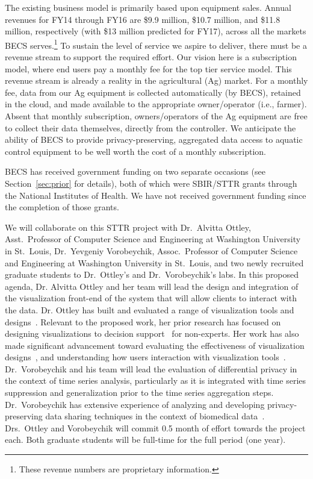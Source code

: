 The existing business model is primarily based upon equipment sales.
Annual revenues for FY14 through FY16 are \$9.9 million, \$10.7 million,
and \$11.8 million, respectively
(with \$13 million predicted for FY17), across all the markets BECS
serves.\footnote{These revenue numbers are proprietary information.}
To sustain the level of service we aspire to deliver, there must be
a revenue stream to support the required effort.  Our vision here is
a subscription model, where end users pay a monthly fee for the
top tier service model.
This revenue stream is already a reality in the agricultural (Ag) market.
For a monthly fee, data from our Ag equipment is collected automatically
(by BECS), retained in the cloud, and made available to the appropriate
owner/operator (i.e., farmer).  Absent that monthly subscription,
owners/operators of the Ag equipment are free to collect their data
themselves, directly from the controller.
We anticipate the ability of BECS to provide privacy-preserving,
aggregated data access to aquatic control equipment to be well worth
the cost of a monthly subscription.

BECS has received government funding on two separate occasions
(see Section~\ref{sec:prior} for details), both of which were SBIR/STTR
grants through the National Institutes of Health.  We have not received
government funding since the completion of those grants.

We will collaborate on this STTR project with Dr.~Alvitta Ottley,
Asst.~Professor of Computer Science and Engineering at Washington University
in St.~Louis, Dr.~Yevgeniy Vorobeychik, Assoc.~Professor of Computer Science and Engineering at Washington University
in St.~Louis, and two newly recruited graduate students to
Dr.~Ottley's and Dr.~Vorobeychik's labs.
In this proposed agenda, Dr. Alvitta Ottley and her team will lead the design and integration of the visualization front-end of the system that will allow clients to interact with the data.
Dr. Ottley has built and evaluated a range of visualization tools and designs~\cite{brown2014finding, hakone2017proact,ottley2015personality,peck2013using}. 
Relevant to the proposed work, her prior research has focused on designing visualizations to decision support~\cite{hakone2017proact,ottley2012visually,ottley2016improving} for non-experts. 
Her work has also made significant advancement toward evaluating the
effectiveness of visualization
designs~\cite{peck2013using,ziemkiewicz2013visualization}, and
understanding how users interaction with visualization
tools~\cite{brown2014finding,ottley2015personality}.  
Dr.~Vorobeychik and his team will lead the evaluation of differential
privacy in the context of time series analysis, particularly as it is
integrated with time series suppression and generalization prior to
the time series aggregation steps.
Dr.~Vorobeychik has extensive experience of analyzing and developing
privacy-preserving data sharing techniques in the context of
biomedical data~\cite{Wan17b,Wan15,Wan17a,Xia15}.
Drs.~Ottley and Vorobeychik will commit 0.5 month of effort towards
the project each.
Both graduate students will be full-time for the full period (one year).

